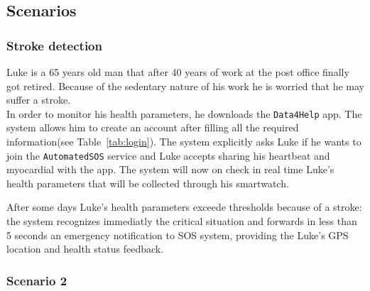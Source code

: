   \subsection{Scenarios}

\subsubsection{Stroke detection} %
    \label{sec:}

      Luke is a 65 years old man that after 40 years of work at the post office finally got retired. Because of the sedentary nature of his work he is worried that he may suffer a stroke.\\
      In order to monitor his health parameters, %
      he downloads the \texttt{Data4Help} app. The system allows him to create an account after filling all the required information(see Table~\ref{tab:login}). The system explicitly asks Luke if he wants to join the \texttt{AutomatedSOS} service and Luke accepts sharing his heartbeat and myocardial with the app. The system will now on check in real time Luke's health parameters that will be collected through his smartwatch. %

      After some days Luke's health parameters exceede thresholds because of a stroke: the system recognizes immediatly the critical situation and forwards in less than 5 seconds an emergency notification to SOS system, providing the Luke's GPS location and health status feedback.


    \subsubsection{Scenario 2}

